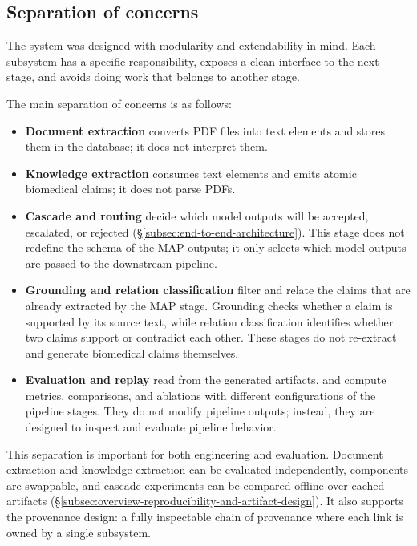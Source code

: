 \subsection{Separation of concerns}\label{subsec:overview-separation-of-concerns}

The system was designed with modularity and extendability in mind. Each subsystem has a specific responsibility, exposes a clean interface to the next stage, and avoids doing work that belongs to another stage.

\medskip{}

The main separation of concerns is as follows:

\begin{itemize}[label={},leftmargin=1.5em]
    \item \textbf{Document extraction} converts PDF files into text elements and stores them in the database; it does not interpret them.

    \item \textbf{Knowledge extraction} consumes text elements and emits atomic biomedical claims; it does not parse PDFs.

    \item \textbf{Cascade and routing} decide which model outputs will be accepted, escalated, or rejected (§\ref{subsec:end-to-end-architecture}). This stage does not redefine the schema of the MAP outputs; it only selects which model outputs are passed to the downstream pipeline.

    \item \textbf{Grounding and relation classification} filter and relate the claims that are already extracted by the MAP stage. Grounding checks whether a claim is supported by its source text, while relation classification identifies whether two claims support or contradict each other. These stages do not re-extract and generate biomedical claims themselves.

    \item \textbf{Evaluation and replay} read from the generated artifacts, and compute metrics, comparisons, and ablations with different configurations of the pipeline stages. They do not modify pipeline outputs; instead, they are designed to inspect and evaluate pipeline behavior.
\end{itemize}

This separation is important for both engineering and evaluation. Document extraction and knowledge extraction can be evaluated independently, components are swappable, and cascade experiments can be compared offline over cached artifacts (§\ref{subsec:overview-reproducibility-and-artifact-design}). It also supports the provenance design: a fully inspectable chain of provenance where each link is owned by a single subsystem. 